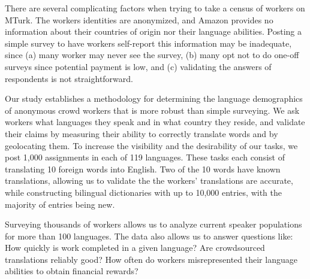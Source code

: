 \documentclass[11pt]{article}
\begin{document}

There are several complicating factors when trying to take a census of workers on MTurk.  The workers identities are anonymized, and Amazon provides no information about their countries of origin nor their language abilities.  Posting a simple survey to have workers self-report this information may be inadequate, since (a) many worker may never see the survey, (b) many opt not to do one-off surveys since potential payment is low, and (c) validating the answers of respondents is not straightforward. 

Our study establishes a methodology for determining the language demographics of anonymous crowd workers that is more robust than simple surveying. We ask workers what languages they speak and in what country they reside, and validate their claims by measuring their ability to correctly translate words and by geolocating them.  To increase the visibility and the desirability of our tasks, we post 1,000 assignments in each of 119 languages.  These tasks each consist of translating 10 foreign words into English.  Two of the 10 words have known translations, allowing us to validate the the workers' translations are accurate, while constructing bilingual dictionaries with up to 10,000 entries, with the majority of entries being new. 

Surveying thousands of workers allows us to analyze current speaker populations for more than 100 languages.  The data also allows us to answer questions like: 
How quickly is work completed in a given language? 
Are crowdsourced translations reliably good? 
How often do workers misrepresented their language abilities to 
obtain financial rewards? 
\end{document}
